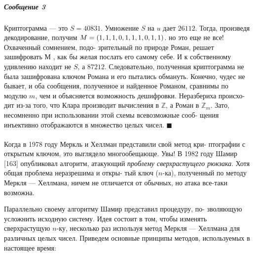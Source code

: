 \documentclass{../template/mai_book}
\begin{document}
\subparagraph{Сообщение 3}
Криптограмма — это $S = 40831$. Умножение\linebreak
$S$ на $u$ дает $26112$. Тогда, произведя декодирование, получим $M =\linebreak
(1,1,1,0,1,1,1,0,1,1)$. но это еще не все! Охваченный сомнением, подо­-\linebreak
зрительный по природе Роман, решает зашифровать $М$ , как бы желая\linebreak
послать его самому себе. И к собственному удивлению находит не $S$, а\linebreak
$87 212$. Следовательно, полученная криптограмма не была зашифрована\linebreak
ключом Романа и его пытались обмануть. Конечно, чудес не бывает, и\linebreak
оба сообщения, полученное и найденное Романом, сравнимы по модулю\linebreak
$m$, чем и объясняется возможность дешифровки. Неразбериха происхо­-\linebreak
дит из-за того, что Клара производит вычисления в $\mathbb{Z}$, а Роман в $\mathbb{Z}_m$.\linebreak
Зато, несомненно при использовании этой схемы всевозможные сооб-\linebreak
щения инъективно отображаются в множество целых чисел. $\blacksquare$
\paragraph{}
Когда в 1978 году Меркль и Хеллман представили свой метод кри­-\linebreak
птографии с открытым ключом, это выглядело многообещающе. Увы!\linebreak
В 1982 году Шамир [163] опубликовал алгоритм, атакующий \textit{проблему\linebreak
сверхрастущего рюкзака}. Хотя общая проблема неразрешима и откры­-\linebreak
тый ключ ($n$-ка), полученный по методу Меркля — Хеллмана, ничем\linebreak
не отличается от обычных, но атака все-таки возможна.

Параллельно своему алгоритму Шамир представил процедуру, по-\linebreak­
зволяющую усложнить исходную систему. Идея состоит в том, чтобы\linebreak
изменять сверхрастущую $n$-ку, несколько раз используя метод Меркля\linebreak
--- Хеллмана для различных целых чисел. Приведем основные принципы\linebreak
методов, используемых в настоящее время:
\end{document}
